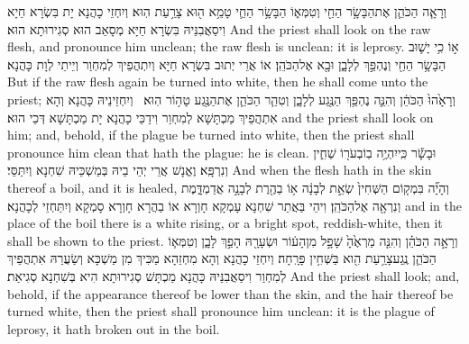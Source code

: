 {וְרָאָ֧ה הַכֹּהֵ֛ן אֶת\maqqaf הַבָּשָׂ֥ר הַחַ֖י וְטִמְּא֑וֹ הַבָּשָׂ֥ר הַחַ֛י טָמֵ֥א ה֖וּא צָרַ֥עַת הֽוּא׃}
{וְיִחְזֵי כָהֲנָא יָת בִּשְׂרָא חַיָא וִיסַאֲבִנֵּיהּ בִּשְׂרָא חַיָּא מְסָאַב הוּא סְגִירוּתָא הוּא׃}
{And the priest shall look on the raw flesh, and pronounce him unclean; the raw flesh is unclean: it is leprosy.}{}
{א֣וֹ כִ֥י יָשׁ֛וּב הַבָּשָׂ֥ר הַחַ֖י וְנֶהְפַּ֣ךְ לְלָבָ֑ן וּבָ֖א אֶל\maqqaf הַכֹּהֵֽן׃}
{אוֹ אֲרֵי יְתוּב בִּשְׂרָא חַיָּא וְיִתְהֲפֵיךְ לְמִחְוַר וְיֵיתֵי לְוָת כָּהֲנָא׃}
{But if the raw flesh again be turned into white, then he shall come unto the priest;}{}
{וְרָאָ֙הוּ֙ הַכֹּהֵ֔ן וְהִנֵּ֛ה נֶהְפַּ֥ךְ הַנֶּ֖גַע לְלָבָ֑ן וְטִהַ֧ר הַכֹּהֵ֛ן אֶת\maqqaf הַנֶּ֖גַע טָה֥וֹר הֽוּא׃ \petucha }
{וְיִחְזֵינֵיהּ כָּהֲנָא וְהָא אִתְהֲפֵיךְ מַכְתָּשָׁא לְמִחְוַר וִידַכֵּי כָהֲנָא יָת מַכְתָּשָׁא דְּכֵי הוּא׃}
{and the priest shall look on him; and, behold, if the plague be turned into white, then the priest shall pronounce him clean that hath the plague: he is clean.}{}
{וּבָשָׂ֕ר כִּֽי\maqqaf יִהְיֶ֥ה בֽוֹ\maqqaf בְעֹר֖וֹ שְׁחִ֑ין וְנִרְפָּֽא׃}
{וֶאֱנָשׁ אֲרֵי יְהֵי בֵיהּ בְּמַשְׁכֵּיהּ שִׁחְנָא וְיִתַּסֵּי׃}
{And when the flesh hath in the skin thereof a boil, and it is healed,}{}
{וְהָיָ֞ה בִּמְק֤וֹם הַשְּׁחִין֙ שְׂאֵ֣ת לְבָנָ֔ה א֥וֹ בַהֶ֖רֶת לְבָנָ֣ה אֲדַמְדָּ֑מֶת וְנִרְאָ֖ה אֶל\maqqaf הַכֹּהֵֽן׃}
{וִיהֵי בַּאֲתַר שִׁחְנָא עָמְקָא חָוְרָא אוֹ בַהֲרָא חָוְרָא סָמְקָא וְיִתַּחְזֵי לְכָהֲנָא׃}
{and in the place of the boil there is a white rising, or a bright spot, reddish-white, then it shall be shown to the priest.}{}
{וְרָאָ֣ה הַכֹּהֵ֗ן וְהִנֵּ֤ה מַרְאֶ֙הָ֙ שָׁפָ֣ל מִן\maqqaf הָע֔וֹר וּשְׂעָרָ֖הּ הָפַ֣ךְ לָבָ֑ן וְטִמְּא֧וֹ הַכֹּהֵ֛ן נֶֽגַע\maqqaf צָרַ֥עַת הִ֖וא בַּשְּׁחִ֥ין פָּרָֽחָה׃}
{וְיִחְזֵי כָהֲנָא וְהָא מִחְזַהָא מַכִּיךְ מִן מַשְׁכָּא וְשַׂעֲרַהּ אִתְהֲפֵיךְ לְמִחְוַר וִיסַאֲבִנֵּיהּ כָּהֲנָא מַכְתָּשׁ סְגִירוּתָא הִיא בְּשִׁחְנָא סְגִיאַת׃}
{And the priest shall look; and, behold, if the appearance thereof be lower than the skin, and the hair thereof be turned white, then the priest shall pronounce him unclean: it is the plague of leprosy, it hath broken out in the boil.}{}
